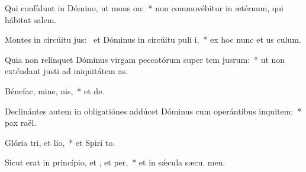 \item Qui confídunt in Dómino, ut mons on:~* non commovébitur in ætérnum, qui hábitat  salem.
\item Montes in circúitu jus:~\pscross{} et Dóminus in circúitu puli i,~* ex hoc nunc et us  culum.
\item Quia non relínquet Dóminus virgam peccatórum super tem jusrum:~* ut non exténdant justi ad iniquitátem  as.
\item Bénefac, mine, nis,~* et  de.
\item Declinántes autem in obligatiónes addúcet Dóminus cum operántibus inquitem:~* pax  raël.
\item Glória tri, et lio,~* et Spirí to.
\item Sicut erat in princípio, et , et per,~* et in sǽcula sæcu. men.
